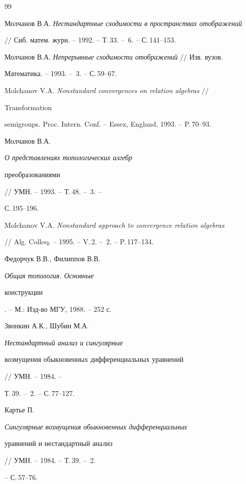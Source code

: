 \begin{thebibliography}{99}







Молчанов В.А. {\em Нестандартные сходимости в пространствах отображений}


// Сиб. матем. журн. -- 1992. -- Т.\,33. -- \No\,6. -- С.\,141--153.




Молчанов В.А. {\em Непрерывные сходимости отображений} // Изв. вузов.


Математика. -- 1993. -- \No\,3. -- С.\,59--67.




Molchanov V.A. {\em Nonstandard convergences on relation algebras} //


Transformation


semigroups. Proc. Intern. Conf. -- Essex, England, 1993. -- P.\,70--93.




Молчанов В.А. {\em О представлениях топологических алгебр


преобразованиями} // УМН. -- 1993. -- Т.\,48. -- \No\,3. --


С.\,195--196.




Molchanov V.A. {\em Nonstandard approach to convergence relation algebras}


// Alg. Colloq. -- 1995. -- V.\,2. -- \No\,2. -- P.\,117--134.




Федорчук В.В., Филиппов В.В. {\em Общая топология. Основные


конструкции}. -- М.: Изд-во МГУ, 1988. -- 252 с.




Звонкин А.К., Шубин М.А. {\em Нестандартный анализ и сингулярные


возмущения обыкновенных дифференциальных уравнений} // УМН. -- 1984. --


Т.\,39. -- \No\,2. -- С.\,77--127.




Картье П. {\em Сингулярные возмущения обыкновенных дифференциальных


уравнений и нестандартный анализ} // УМН. -- 1984. -- Т.\,39. -- \No\,2.


-- С.\,57--76.



\end{thebibliography}
